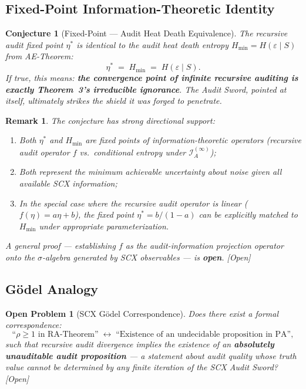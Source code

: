 \documentclass[12pt,a4paper]{article}
\newtheorem{remark}[theorem]{Remark}
\newtheorem{openproblem}[theorem]{Open Problem}
\newtheorem{conjecture}[theorem]{Conjecture}
\newcommand{\openquest}{\textcolor{red!70!black}{\small\textsf{[Open]}}}
\newcommand{\cI}{\mathcal{I}}
\begin{document}
\subsection{Fixed-Point Information-Theoretic Identity}

\begin{conjecture}[Fixed-Point — Audit Heat Death Equivalence]
\label{conj:fixed-point}
The recursive audit fixed point $\eta^*$ is identical to the audit heat death
entropy $H_{\min}=H(\varepsilon\mid S)$ from AE-Theorem:
\begin{equation}\label{eq:fixed-point-identity}
    \eta^* \;=\; H_{\min} \;=\; H(\varepsilon\mid S).
\end{equation}
If true, this means: \textbf{the convergence point of infinite recursive
auditing is exactly Theorem~3's irreducible ignorance}.  The Audit Sword,
pointed at itself, ultimately strikes the shield it was forged to penetrate.
\end{conjecture}

\begin{remark}
The conjecture has strong directional support:
\begin{enumerate}[label=(\roman*)]
    \item Both $\eta^*$ and $H_{\min}$ are fixed points of information-theoretic
          operators (recursive audit operator $f$ vs.\ conditional entropy
          under $\cI_A^{(\infty)}$);
    \item Both represent the \emph{minimum achievable uncertainty} about noise
          given all available SCX information;
    \item In the special case where the recursive audit operator is linear
          ($f(\eta)=a\eta+b$), the fixed point $\eta^*=b/(1-a)$ can be
          explicitly matched to $H_{\min}$ under appropriate parameterization.
\end{enumerate}
A general proof — establishing $f$ as the audit-information projection operator
onto the $\sigma$-algebra generated by SCX observables — is \textbf{open}.
\openquest
\end{remark}

\subsection{G\"odel Analogy}

\begin{openproblem}[SCX G\"odel Correspondence]
\label{prob:godel}
Does there exist a formal correspondence:
\begin{equation}\label{eq:godel-correspondence}
    \text{``$\rho\geq1$ in RA-Theorem''}
    \;\longleftrightarrow\;
    \text{``Existence of an undecidable proposition in PA''},
\end{equation}
such that recursive audit divergence implies the existence of an
\textbf{absolutely unauditable audit proposition} — a statement about audit
quality whose truth value cannot be determined by any finite iteration of the
SCX Audit Sword?  \openquest
\end{openproblem}
\end{document}
